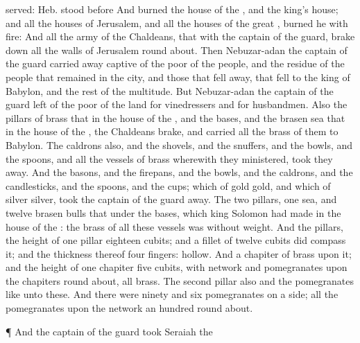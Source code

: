 {{served: Heb. stood before}
And
burned the
house of the
{}, and the
king’s
house; and all the
houses of
Jerusalem, and all the
houses of the
great
{},
burned he with
fire:
And all the
army of the
Chaldeans, that
{} with the
captain of the
guard, brake
down all the
walls of
Jerusalem round
about.
Then
Nebuzar-adan the
captain of the
guard carried away
captive
{} of the
poor of the
people, and the
residue of the
people that
remained in the
city, and those that fell
away, that
fell to the
king of
Babylon, and the
rest of the
multitude.
But
Nebuzar-adan the
captain of the
guard
left
{} of the
poor of the
land for
vinedressers and for
husbandmen.
Also the
pillars of
brass that
{} in the
house of the
{}, and the
bases, and the
brasen
sea that
{} in the
house of the
{}, the
Chaldeans
brake, and
carried all the
brass of them to
Babylon.
The
caldrons also, and the
shovels, and the
snuffers, and the
bowls, and the
spoons, and all the
vessels of
brass wherewith they
ministered, took they
away.
And the
basons, and the
firepans, and the
bowls, and the
caldrons, and the
candlesticks, and the
spoons, and the
cups;
{} which
{} of
gold
{}
gold, and
{} which
{} of
silver
{}
silver,
took the
captain of the
guard
away.
The
two
pillars,
one
sea, and
twelve
brasen
bulls that
{} under the
bases, which
king
Solomon had
made in the
house of the
{}: the
brass of all these
vessels was without
weight.
And
{} the
pillars, the
height of
one
pillar
{}
eighteen
cubits; and a
fillet of
twelve
cubits did
compass it; and the
thickness thereof
{}
four
fingers:
{}
hollow.
And a
chapiter of
brass
{} upon it; and the
height of
one
chapiter
{}
five
cubits, with
network and
pomegranates upon the
chapiters round
about, all
{}
brass. The
second
pillar also and the
pomegranates
{} like unto these.
And there were
ninety and
six
pomegranates on a
side;
{} all the
pomegranates upon the
network
{} an
hundred round
about.
\par }{\PP {}¶ And the
captain of the
guard
took
Seraiah the
}

